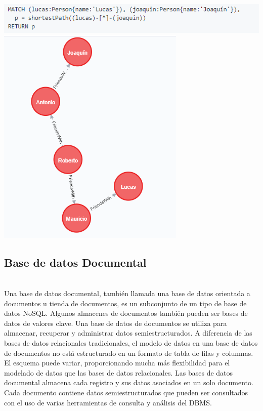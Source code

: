 \documentclass[twoside,onecolumn]{article}
\begin{document}
\begin{flushright}
\begin{itemize}
\begin{center}
\includegraphics[scale=0.7]{Imagenes/neo4j12}
\includegraphics[scale=0.7]{Imagenes/neo4j11}
\end{center}	



\subsection{Base de datos Documental}

\textbf{}\\Una base de datos documental, también llamada una base de datos orientada a documentos u tienda de documentos, es un subconjunto de un tipo de base de datos NoSQL.
Algunos almacenes de documentos también pueden ser bases de datos de valores clave. Una base de datos de documentos se utiliza para almacenar, recuperar y administrar datos semiestructurados.
A diferencia de las bases de datos relacionales tradicionales, el modelo de datos en una base de datos de documentos no está estructurado en un formato de tabla de filas y columnas.
El esquema puede variar, proporcionando mucha más flexibilidad para el modelado de datos que las bases de datos relacionales.
Las bases de datos documental almacena cada registro y sus datos asociados en un solo documento. Cada documento contiene datos semiestructurados que pueden ser consultados con el uso de varias herramientas de consulta y análisis del DBMS.




\end{itemize}
\end{flushright}
\end{document}
